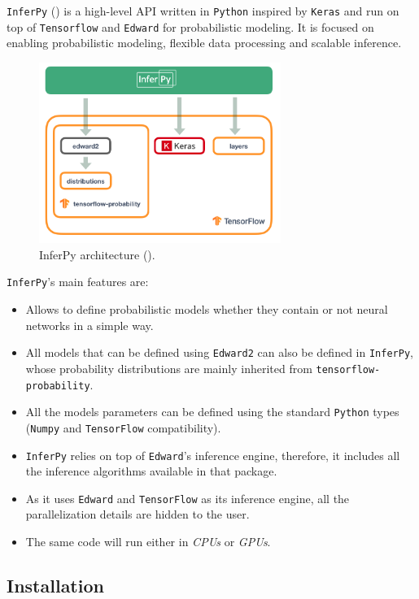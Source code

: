 
\texttt{InferPy} (\cite{cozar2019inferpy}) is a high-level API written in \texttt{Python} inspired by \texttt{Keras} and run on top of \texttt{Tensorflow} and \texttt{Edward} for probabilistic modeling. It is focused on enabling probabilistic modeling, flexible data processing and scalable inference.

\begin{figure}[h!]
    \centering
    \includegraphics[width=0.7\textwidth]{tex/images/arch.png}
    \caption{InferPy architecture (\cite{cozar2019inferpy}).}
\end{figure}

\texttt{InferPy}'s main features are:
\begin{itemize}
  \item Allows to define probabilistic models whether they contain or not neural networks in a simple way.
  \item All models that can be defined using \texttt{Edward2} can also be defined in  \texttt{InferPy}, whose probability distributions are mainly inherited from \texttt{tensorflow-probability}.
  \item All the models parameters can be defined using the standard \texttt{Python} types (\texttt{Numpy} and \texttt{TensorFlow} compatibility).
  \item \texttt{InferPy} relies on top of \texttt{Edward}'s inference engine, therefore, it includes all the inference algorithms available in that package.
  \item As it uses \texttt{Edward} and \texttt{TensorFlow} as its inference engine, all the parallelization details are hidden to the user.
  \item The same code will run either in \textit{CPUs} or \textit{GPUs}.
\end{itemize}

\subsection{Installation}

